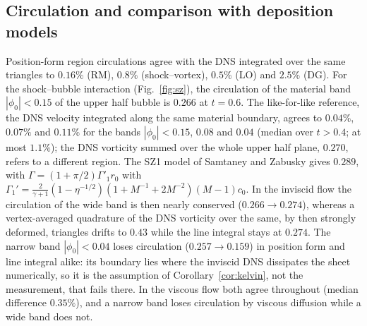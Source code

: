 \documentclass[11pt]{article}
\theoremstyle{definition}\newtheorem{definition}{Definition}\theoremstyle{remark}\newtheorem{remark}{Remark}
\begin{document}
\subsection{Circulation and comparison with deposition models}\label{sec:circ}
Position-form region circulations agree with the DNS integrated over the same triangles to $0.16\%$ (RM), $0.8\%$ (shock--vortex), $0.5\%$ (LO) and $2.5\%$ (DG). For the shock--bubble interaction (Fig.~\ref{fig:sz}), the circulation of the material band $|\phi_0|<0.15$ of the upper half bubble is $0.266$ at $t=0.6$. The like-for-like reference, the DNS velocity integrated along the same material boundary, agrees to $0.04\%$, $0.07\%$ and $0.11\%$ for the bands $|\phi_0|<0.15$, $0.08$ and $0.04$ (median over $t>0.4$; at most $1.1\%$); the DNS vorticity summed over the whole upper half plane, $0.270$, refers to a different region. The SZ1 model of Samtaney and Zabusky \citep{SamtaneyZabusky1994} gives $0.289$, with $\Gamma=(1+\pi/2)\Gamma'_1r_0$ with $\Gamma_1'=\frac{2}{\gamma+1}(1-\eta^{-1/2})(1+M^{-1}+2M^{-2})(M-1)c_0$. In the inviscid flow the circulation of the wide band is then nearly conserved ($0.266\to0.274$), whereas a vertex-averaged quadrature of the DNS vorticity over the same, by then strongly deformed, triangles drifts to $0.43$ while the line integral stays at $0.274$. The narrow band $|\phi_0|<0.04$ loses circulation ($0.257\to0.159$) in position form and line integral alike: its boundary lies where the inviscid DNS dissipates the sheet numerically, so it is the assumption of Corollary~\ref{cor:kelvin}, not the measurement, that fails there. In the viscous flow both agree throughout (median difference $0.35\%$), and a narrow band loses circulation by viscous diffusion while a wide band does not.
\end{document}

